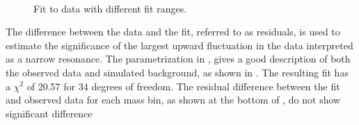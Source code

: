 \begin{figure}[h!]
\centering
  \\
 \caption{Fit to data with different fit ranges.}
\label{fig:DiffRangeFit}
\end{figure}
The difference between the data and the fit, referred to as residuals, is used to estimate the significance of the largest upward fluctuation in 
the data interpreted as a narrow resonance. The parametrization in \eqn{\ref{Eq:fitFunc}}, gives a good description of both the observed data and
simulated background, as shown in \fig{\ref{fig:massFit}}. The resulting fit has a $\chi^{2}$ of 20.57 for 34 degrees of freedom. The residual 
difference between the fit and observed data for each mass bin, as shown at the bottom of \fig{\ref{fig:massFit}}, do not show significant difference
